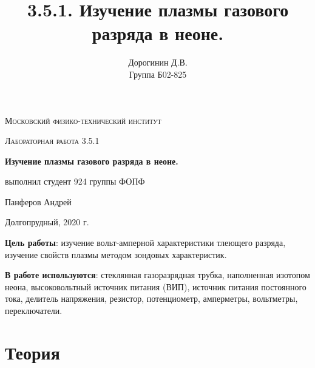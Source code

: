 \documentclass[a4paper,12pt]{article}
\author{Дорогинин Д.В.\\
Группа Б02-825}
\title{3.5.1. Изучение плазмы газового разряда в неоне.}
\date{}
\begin{document}
\begin{titlepage}
	\centering
	\vspace{5cm}
	{\scshape\LARGE Московский физико-технический институт \par}
	\vspace{4cm}
	{\scshape\Large Лабораторная работа 3.5.1 \par}
	\vspace{1cm}
	{\huge\bfseries Изучение плазмы газового разряда в неоне. \par}
	\vspace{1cm}
	\vfill
\begin{flushright}
	{\large выполнил студент 924 группы ФОПФ}\par
	\vspace{0.3cm}
	{\LARGE Панферов Андрей}
\end{flushright}
	

	\vfill

	Долгопрудный, 2020 г.
\end{titlepage}

\textbf{Цель работы}: изучение вольт-амперной характеристики тлеющего разряда, изучение свойств плазмы методом зондовых характеристик.


\textbf{В работе используются}: стеклянная газоразрядная трубка, наполненная изотопом неона, высоковольтный источник питания (ВИП), источник питания постоянного тока, делитель напряжения, резистор, потенциометр, амперметры, вольтметры, переключатели.
\section*{Теория}
\end{document}
